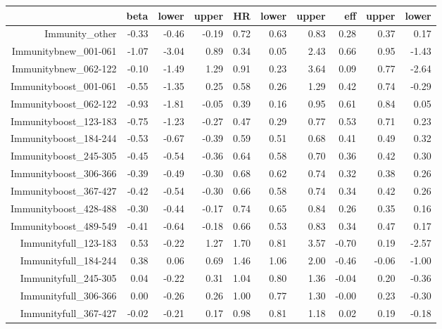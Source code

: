 \begin{table}[ht]
\centering
\begin{tabular}{rrrrrrrrrr}
  \hline
 & beta & lower & upper & HR & lower & upper & eff & upper & lower \\ 
  \hline
Immunity\_other & -0.33 & -0.46 & -0.19 & 0.72 & 0.63 & 0.83 & 0.28 & 0.37 & 0.17 \\ 
  Immunitybnew\_001-061 & -1.07 & -3.04 & 0.89 & 0.34 & 0.05 & 2.43 & 0.66 & 0.95 & -1.43 \\ 
  Immunitybnew\_062-122 & -0.10 & -1.49 & 1.29 & 0.91 & 0.23 & 3.64 & 0.09 & 0.77 & -2.64 \\ 
  Immunityboost\_001-061 & -0.55 & -1.35 & 0.25 & 0.58 & 0.26 & 1.29 & 0.42 & 0.74 & -0.29 \\ 
  Immunityboost\_062-122 & -0.93 & -1.81 & -0.05 & 0.39 & 0.16 & 0.95 & 0.61 & 0.84 & 0.05 \\ 
  Immunityboost\_123-183 & -0.75 & -1.23 & -0.27 & 0.47 & 0.29 & 0.77 & 0.53 & 0.71 & 0.23 \\ 
  Immunityboost\_184-244 & -0.53 & -0.67 & -0.39 & 0.59 & 0.51 & 0.68 & 0.41 & 0.49 & 0.32 \\ 
  Immunityboost\_245-305 & -0.45 & -0.54 & -0.36 & 0.64 & 0.58 & 0.70 & 0.36 & 0.42 & 0.30 \\ 
  Immunityboost\_306-366 & -0.39 & -0.49 & -0.30 & 0.68 & 0.62 & 0.74 & 0.32 & 0.38 & 0.26 \\ 
  Immunityboost\_367-427 & -0.42 & -0.54 & -0.30 & 0.66 & 0.58 & 0.74 & 0.34 & 0.42 & 0.26 \\ 
  Immunityboost\_428-488 & -0.30 & -0.44 & -0.17 & 0.74 & 0.65 & 0.84 & 0.26 & 0.35 & 0.16 \\ 
  Immunityboost\_489-549 & -0.41 & -0.64 & -0.18 & 0.66 & 0.53 & 0.83 & 0.34 & 0.47 & 0.17 \\ 
  Immunityfull\_123-183 & 0.53 & -0.22 & 1.27 & 1.70 & 0.81 & 3.57 & -0.70 & 0.19 & -2.57 \\ 
  Immunityfull\_184-244 & 0.38 & 0.06 & 0.69 & 1.46 & 1.06 & 2.00 & -0.46 & -0.06 & -1.00 \\ 
  Immunityfull\_245-305 & 0.04 & -0.22 & 0.31 & 1.04 & 0.80 & 1.36 & -0.04 & 0.20 & -0.36 \\ 
  Immunityfull\_306-366 & 0.00 & -0.26 & 0.26 & 1.00 & 0.77 & 1.30 & -0.00 & 0.23 & -0.30 \\ 
  Immunityfull\_367-427 & -0.02 & -0.21 & 0.17 & 0.98 & 0.81 & 1.18 & 0.02 & 0.19 & -0.18 \\ 

\end{tabular}
\end{table}
